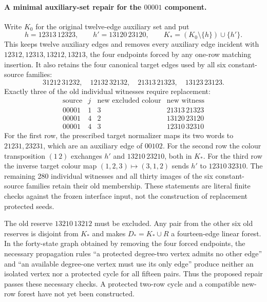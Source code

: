 \paragraph{A minimal auxiliary-set repair for the $00001$ component.}
Write $K_0$ for the original twelve-edge auxiliary set and put
\[
 h=12313\,12323,\qquad h'=13120\,23120,\qquad
 K_*=(K_0\setminus\{h\})\cup\{h'\}.
\]
This keeps twelve auxiliary edges and removes every auxiliary edge
incident with $12312,12313,13212,13213$, the four endpoints forced
by any one-row matching insertion. It also retains the four canonical
target edges used by all six constant-source families:
\[
31212\,31232,\quad12132\,32132,\quad
21313\,21323,\quad13123\,23123.
\]
Exactly three of the old individual witnesses require replacement:
\[
\begin{array}{c|c|c|c}
\text{source}&j&\text{new excluded colour}&\text{new witness}\\
\hline
00001&1&3&21313\,21323\\
00001&4&2&13120\,23120\\
00001&4&3&12310\,32310
\end{array}
\]
For the first row, the prescribed target normalizer maps its two
words to $21231,23231$, which are an auxiliary edge of $00102$.
For the second row the colour transposition $(1\,2)$ exchanges
$h'$ and $13210\,23210$, both in $K_*$.
For the third row the inverse target colour map
$(1,2,3)\mapsto(3,1,2)$ sends $h'$ to $12310\,32310$.
The remaining 280 individual witnesses and all thirty images of
the six constant-source families retain their old membership.
These statements are literal finite checks against the frozen
interface input, not the construction of replacement protected seeds.

The old reserve $13210\,13212$ must be excluded. Any pair from the
other six old reserves is disjoint from $K_*$ and makes
$D_*=K_*\cup R$ a fourteen-edge linear forest. In the forty-state
graph obtained by removing the four forced endpoints, the necessary
propagation rules ``a protected degree-two vertex admits no other
edge'' and ``an available degree-one vertex must use its only edge''
produce neither an isolated vertex nor a protected cycle for all
fifteen pairs. Thus the proposed repair passes these necessary
checks. A protected two-row cycle and a compatible new-row forest
have not yet been constructed.

